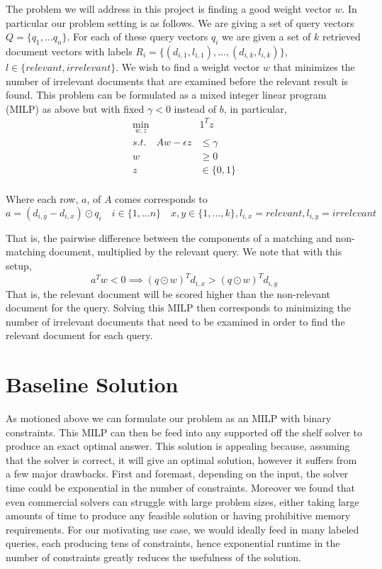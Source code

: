 \documentclass[a4paper]{article}
\begin{document}
The problem we will address in this project is finding a good weight vector $w$. In particular our
problem setting is as follows. We are giving a set of query vectors $Q = \{q_1, ... q_n\}$. For each 
of these query vectors $q_i$ we are given a set of $k$ retrieved document vectors with labels $R_i = \{(d_{i,1}, l_{i,1}), ..., (d_{i, k}, l_{i,k})\}$, 
$l \in \{relevant, irrelevant\}$.
We wish to find a weight vector $w$ that minimizes the number of irrelevant documents that are examined 
before the relevant result is found. This problem can be formulated as a mixed integer linear program (MILP)
as above but with fixed $\gamma < 0$ instead of $b$, in particular,
\begin{align*}
\min_{w,z}\quad &1^Tz\\
s.t. \quad Aw - \epsilon z &\leq \gamma\\
		w &\geq 0\\
		z &\in \{0,1\}\\
\end{align*}

Where each row, $a$, of $A$ comes corresponds to 
$$
a = (d_{i,y} - d_{i,x}) \odot q_i  \quad i \in \{1,...n\} \quad x,y \in \{1,...,k\}, l_{i,x} = relevant, l_{i,y} = irrelevant
$$

That is, the pairwise difference between the components of a matching and non-matching document, multiplied by the 
relevant query. We note that with this setup, 
$$
a^Tw < 0 \implies (q\odot w)^Td_{i,x} > (q\odot w)^Td_{i,y}
$$
That is, the relevant document will be scored higher than the non-relevant document for the query. Solving this 
MILP then corresponds to minimizing the number of irrelevant documents that need to be 
examined in order to find the relevant document for each query. 

\section{Baseline Solution}

As motioned above we can formulate our problem as an  MILP with binary
constraints. This MILP can then be feed into any supported off the shelf solver
to produce an exact optimal answer.  This solution is appealing because,
assuming that the solver is correct, it will give an optimal solution, however
it suffers from a few major drawbacks.  First and foremast, depending on the
input, the solver time could be exponential in the number of constraints.
Moreover we found that even commercial solvers can struggle with large problem
sizes, either taking large amounts of time to produce any feasible solution or
having prohibitive memory requirements.  For our motivating use case, we would
ideally feed in many labeled queries, each producing tens of constraints, hence
exponential runtime in the number of constraints greatly reduces the usefulness
of the solution. 
\end{document}
